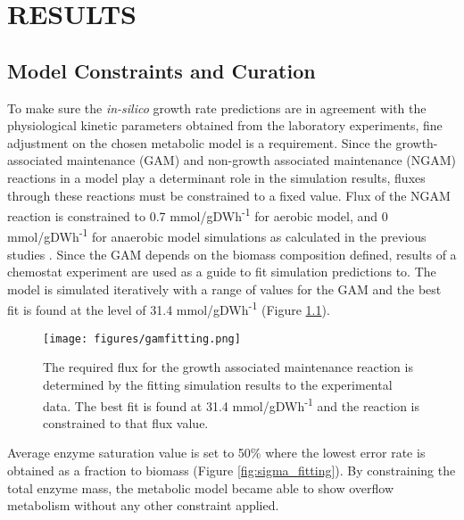 \chapter{RESULTS}

\section{Model Constraints and Curation}

To make sure the \emph{in-silico} growth rate predictions are in agreement with the physiological kinetic parameters obtained from the laboratory experiments, fine adjustment on the chosen metabolic model is a requirement. Since the growth-associated maintenance (GAM) and non-growth associated maintenance (NGAM) reactions in a model play a determinant role in the simulation results, fluxes through these reactions must be constrained to a fixed value. Flux of the NGAM reaction is constrained to 0.7 mmol/gDWh\textsuperscript{-1} for aerobic model, and 0 mmol/gDWh\textsuperscript{-1} for anaerobic model simulations as calculated in the previous studies \cite{nilsson2016metabolic}. Since the GAM depends on the biomass composition defined, results of a chemostat experiment \cite{van1998effect} are used as a guide to fit simulation predictions to. The model is simulated iteratively with a range of values for the GAM and the best fit is found at the level of 31.4 mmol/gDWh\textsuperscript{-1} (Figure \ref{fig:gam_fitting}).

\begin{figure}[H]
  \begin{center}
      \texttt{[image: figures/gamfitting.png]}
      \caption[The required flux for the growth associated maintenance reaction is determined by the fitting simulation results to the experimental data]{The required flux for the growth associated maintenance reaction is determined by the fitting simulation results to the experimental data. The best fit is found at 31.4 mmol/gDWh\textsuperscript{-1} and the reaction is constrained to that flux value.}
      \label{fig:gam_fitting}
  \end{center}
\end{figure}

Average enzyme saturation value is set to 50\% where the lowest error rate is obtained as a fraction to biomass (Figure \ref{fig:sigma_fitting}). By constraining the total enzyme mass, the metabolic model became able to show overflow metabolism without any other constraint applied.

